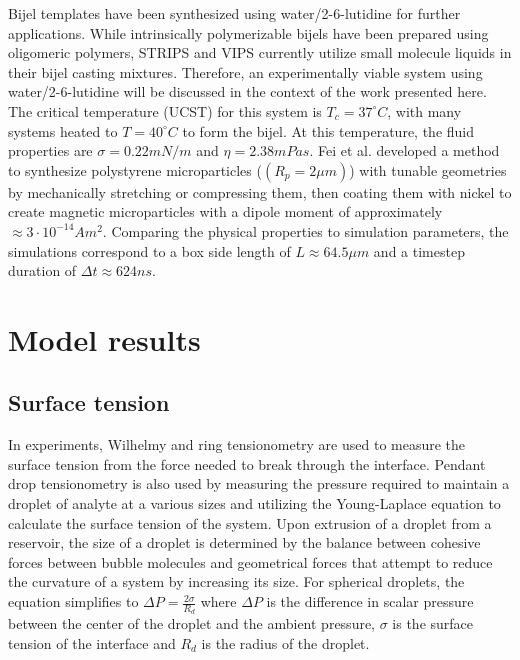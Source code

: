 Bijel templates have been synthesized using water/2-6-lutidine for further applications. \cite{lee_making_2013} 
While intrinsically polymerizable bijels have been prepared using oligomeric polymers, STRIPS and VIPS currently 
utilize small molecule liquids in their bijel casting mixtures. Therefore, an experimentally viable system using 
water/2-6-lutidine will be discussed in the context of the work presented here. The critical temperature (UCST) 
for this system is $T_c = 37 ^{\circ}C$, with many systems heated to $T = 40^{\circ}C$ to form the bijel. At this 
temperature, the fluid properties are $\sigma = 0.22 mN/m$ and $\eta = 2.38 mPas$. \cite{grattoni_lower_1993} 
Fei et al. developed a method to synthesize polystyrene microparticles ($(R_p = 2 \mu m)$) with tunable geometries 
by mechanically stretching or compressing them, then coating them with nickel to create magnetic microparticles with 
a dipole moment of approximately$\approx 3 \cdot 10^{-14} Am^2$. \cite{fei_active_2017, fei_magneto-capillary_2020} 
Comparing the physical properties to simulation parameters, the simulations correspond to a box side length of 
$L \approx 64.5 \mu m$ and a timestep duration of $\Delta t \approx 624 ns$. 

\section{Model results}
\label{section:model_results}

\subsection{Surface tension}
\label{section:model_surface_tension}

In experiments, Wilhelmy and ring tensionometry are used to measure the surface tension from the force needed 
to break through the interface. Pendant drop tensionometry is also used by measuring the pressure required to 
maintain a droplet of analyte at a various sizes and utilizing the Young-Laplace equation to calculate the 
surface tension of the system. \cite{sun_assembly_2013, berry_measurement_2015}
Upon extrusion of a droplet from a reservoir, the size of a droplet is determined by the balance between 
cohesive forces between bubble molecules and geometrical forces that attempt to reduce the curvature of a 
system by increasing its size. For spherical droplets, the equation simplifies to 
$\Delta P = \frac{2 \sigma}{R_d}$ where $\Delta P$ is the difference in scalar pressure 
between the center of the droplet and the ambient pressure, $\sigma$ is the surface tension 
of the interface and $R_d$ is the radius of the droplet. 

